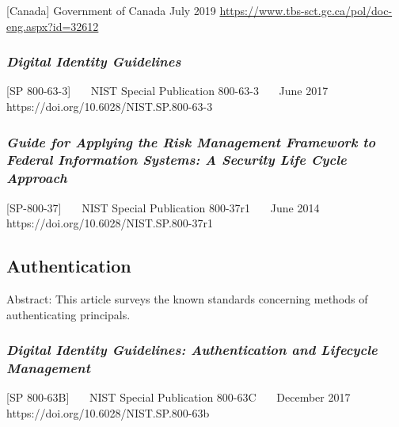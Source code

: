 {[}Canada{]} Government of Canada July 2019
\url{https://www.tbs-sct.gc.ca/pol/doc-eng.aspx?id=32612}

\hypertarget{digital-identity-guidelines}{%
\subsubsection{\texorpdfstring{\emph{Digital Identity
Guidelines}}{Digital Identity Guidelines}}\label{digital-identity-guidelines}}

{[}SP 800-63-3{]}~~~ NIST Special Publication 800-63-3~~~ June 2017~~~
https://doi.org/10.6028/NIST.SP.800-63-3~~~

\hypertarget{guide-for-applying-the-risk-management-framework-to-federal-information-systems-a-security-life-cycle-approach}{%
\subsubsection{\texorpdfstring{\emph{Guide for Applying the Risk Management
Framework to Federal Information Systems: A Security Life Cycle
Approach}}{Guide for Applying the Risk Management Framework to Federal Information Systems: A Security Life Cycle Approach}}\label{guide-for-applying-the-risk-management-framework-to-federal-information-systems-a-security-life-cycle-approach}}

{[}SP-800-37{]}~~~ NIST Special Publication 800-37r1~~~ June 2014~~~
https://doi.org/10.6028/NIST.SP.800-37r1~~~

\hypertarget{authentication-2}{%
\subsection{Authentication}\label{authentication-2}}

Abstract: This article surveys the known standards concerning methods of
authenticating principals.

\hypertarget{digital-identity-guidelines-authentication-and-lifecycle-management}{%
\subsubsection{\texorpdfstring{\emph{Digital Identity Guidelines:
Authentication and Lifecycle
Management}}{Digital Identity Guidelines: Authentication and Lifecycle Management}}\label{digital-identity-guidelines-authentication-and-lifecycle-management}}

{[}SP 800-63B{]}~~~ NIST Special Publication 800-63C~~~ December 2017~~~
https://doi.org/10.6028/NIST.SP.800-63b~~~

